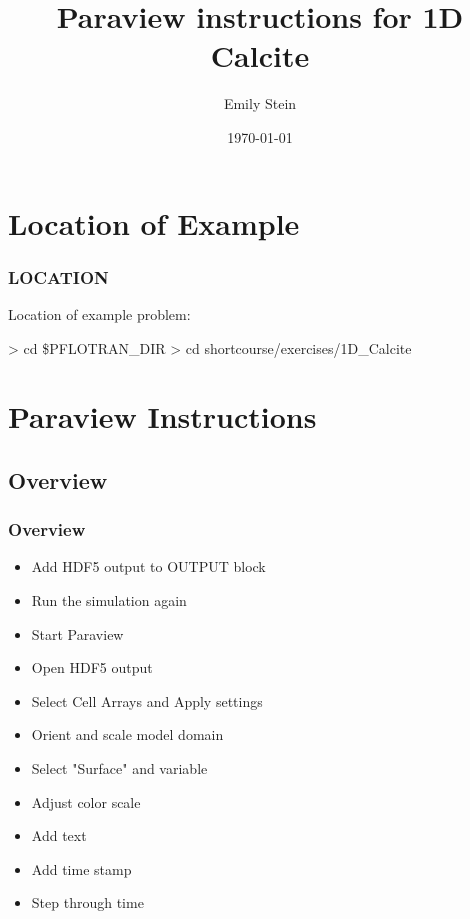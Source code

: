 \documentclass{beamer}
\begin{document}
\title{Paraview instructions for 1D Calcite}
\author{Emily Stein}
\date{\today}


\section{Location of Example}

\begin{frame}\frametitle{LOCATION}

Location of example problem:

\begin{semiverbatim}
> cd \$PFLOTRAN_DIR
> cd shortcourse/exercises/1D_Calcite
\end{semiverbatim}

\end{frame}

\section{Paraview Instructions}

\subsection{Overview}

\begin{frame}\frametitle{Overview}
\begin{itemize}
  \item Add HDF5 output to OUTPUT block
  \item Run the simulation again
  \item Start Paraview
  \item Open HDF5 output
  \item Select Cell Arrays and Apply settings
  \item Orient and scale model domain
  \item Select "Surface" and variable
  \item Adjust color scale
  \item Add text
  \item Add time stamp
  \item Step through time
\end{itemize}

\end{frame}
\end{document}
